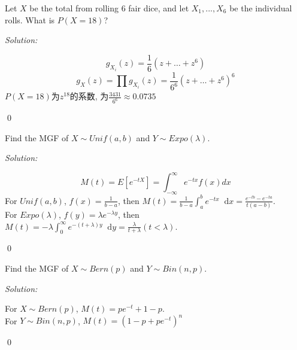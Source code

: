 \documentclass[12pt]{article}
\newenvironment{problem}[2][Problem]{\begin{trivlist}
\item[\hskip \labelsep {\bfseries #1}\hskip \labelsep {\bfseries #2.}]}{\end{trivlist}}
\newenvironment{sol}
    {\emph{Solution:}
    }
    {
    \qed
    }
\newcommand{\intzi}{\int_0^\infty}                                  %
\renewcommand\d{\mathop{}\!\mathrm{d}}                                            %
\newcommand{\f}[2]{\frac{#1}{#2}}                                      %
\newcommand{\ff}[1]{\frac{1}{#1}}                                      %
\renewcommand\l{\lambda}                                               %
\begin{document}




\begin{problem}{1}
Let $X$ be the total from rolling 6 fair dice, and let $X_1,...,X_6$ be the individual rolls. What is $P(X=18)$?
\end{problem}
\begin{sol}
$$g_{X_i}(z)=\ff{6}(z+\dots+z^6)$$
$$g_{X}(z)=\prod g_{X_i}(z) = \ff{6^6}(z+\dots+z^6)^6$$
$P(X=18)$为$z^{18}$的系数, 为$\f{3431}{6^6}\approx0.0735$
\end{sol}
\begin{problem}{2} 
Find the MGF of $X\sim Unif(a,b)$ and $Y\sim Expo(\lambda)$.
\end{problem}
\begin{sol}
$$ 
M(t)=E\left[e^{-t X}\right]=\int_{-\infty}^{\infty} e^{-t x} f(x) d x
$$
For $Unif(a,b)$, $f(x) = \ff{b-a}$, then $M(t) = \ff{b-a}\int_a^b e^{-tx}\d x=\frac{e^{-t b}-e^{-t a}}{t(a-b)}$. \\
For $Expo(\lambda)$, $f(y) = \l e^{-\l y}$, then $M(t) = -\l \intzi e^{-(t+\l)y}\d y = \f{\l}{t+\l}(t<\l)$.
\end{sol}



\begin{problem}{3}
Find the MGF of $X\sim Bern(p)$ and $Y\sim Bin(n,p)$.
\end{problem}
\begin{sol}
For $X\sim Bern(p)$, $M(t) = pe^{-t}+1-p$.\\
For $Y\sim Bin(n,p)$, $M(t)=(1-p+pe^{-t})^n$
\end{sol}
\end{document}

